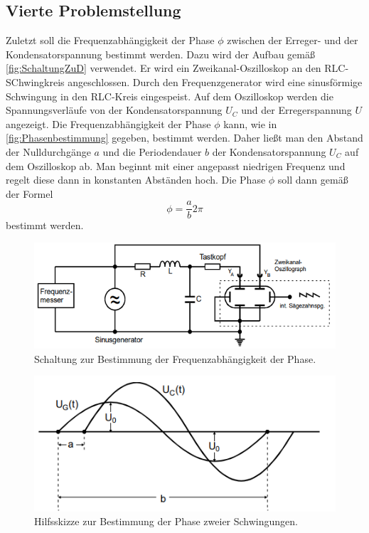 \subsection{Vierte Problemstellung}
Zuletzt soll die Frequenzabhängigkeit der Phase $\phi$ zwischen der Erreger- und der Kondensatorspannung bestimmt werden. Dazu wird der Aufbau gemäß \autoref{fig:SchaltungZuD} verwendet.
Er wird ein Zweikanal-Oszilloskop an den RLC-SChwingkreis angeschlossen. Durch den Frequenzgenerator wird eine sinusförmige Schwingung in den RLC-Kreis eingespeist.
Auf dem Oszilloskop werden die Spannungsverläufe von der Kondensatorspannung $U_{C}$ und der Erregerspannung $U$ angezeigt. Die Frequenzabhängigkeit der Phase $\phi$ kann, wie 
in \autoref{fig:Phasenbestimmung} gegeben, bestimmt werden. Daher ließt man den Abstand der Nulldurchgänge $a$ und die Periodendauer $b$ der Kondensatorspannung $U_{C}$ auf dem 
Oszilloskop ab. Man beginnt mit einer angepasst niedrigen Frequenz und regelt diese dann in konstanten Abständen hoch. Die Phase $\phi$ soll dann gemäß der Formel 
\begin{equation}
    \phi = \frac{a}{b}2\pi 
\end{equation}
bestimmt werden.
\begin{figure}
    \centering
    \includegraphics[width=\textwidth]{content/SchaltungZuD.pdf}
    \caption{Schaltung zur Bestimmung der Frequenzabhängigkeit der Phase.}    
    \label{fig:SchaltungZuD}
\end{figure}
\begin{figure}
    \centering
    \includegraphics[width=\textwidth]{content/Phasenbestimmung.pdf}
    \caption{Hilfsskizze zur Bestimmung der Phase zweier Schwingungen.}    
    \label{fig:Phasenbestimmung}
\end{figure}